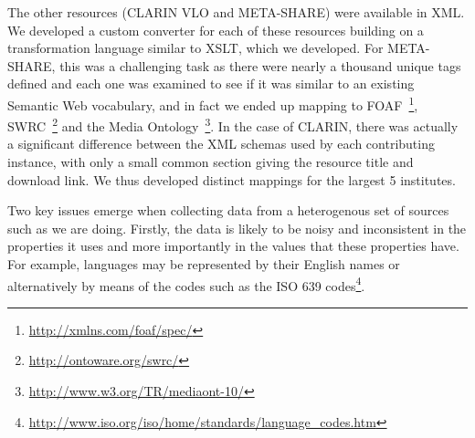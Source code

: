 \documentclass{acm_proc_article-sp}
\begin{document}
The other resources (CLARIN VLO and META-SHARE) were available in XML. We
developed a custom
converter for each of these resources building on a 
transformation language similar to XSLT, which we developed. For META-SHARE, this was a challenging
task as there were nearly a thousand unique tags defined and each one was
examined to see if it was similar to an existing Semantic Web vocabulary, and in
fact we ended up mapping to FOAF~\footnote{\url{http://xmlns.com/foaf/spec/}},
SWRC~\footnote{\url{http://ontoware.org/swrc/}} and the Media
Ontology~\footnote{\url{http://www.w3.org/TR/mediaont-10/}}. In the case of
CLARIN, there was actually a significant difference between the XML schemas used
by each contributing instance, with only a small common section giving the
resource title and download link. We thus developed distinct mappings for the
largest 5 institutes.


Two key issues emerge when collecting data from a heterogenous set of sources 
such as we are doing. Firstly, the data is likely to be noisy and inconsistent 
in the properties it uses and more importantly in the values that these
properties have. For example, languages may be represented by their English 
names or alternatively by means of the codes such as the ISO 639
codes\footnote{\url{http://www.iso.org/iso/home/standards/language_codes.htm}}. 
\end{document}
